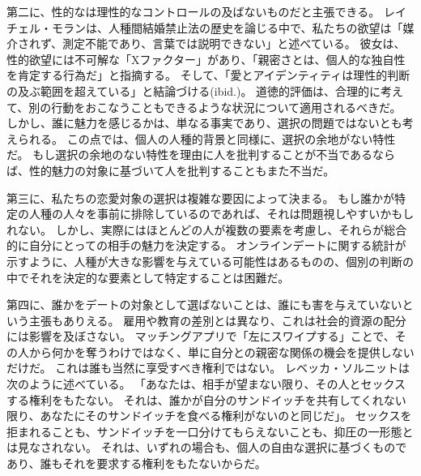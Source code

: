 \documentclass[paper=a4,book,openany]{jlreq}
\begin{document}
第二に、性的なは理性的なコントロールの及ばないものだと主張できる。
レイチェル・モランは、人種間結婚禁止法の歴史を論じる中で、私たちの欲望は「媒介されず、測定不能であり、言葉では説明できない」と述べている\citep[p. 14]{moran01:_inter_intim}。
彼女は、性的欲望には不可解な「Xファクター」があり、「親密さとは、個人的な独自性を肯定する行為だ」と指摘する。
そして、「愛とアイデンティティは理性的判断の及ぶ範囲を超えている」と結論づける(ibid.)。
道徳的評価は、合理的に考えて、別の行動をおこなうこともできるような状況について適用されるべきだ。
しかし、誰に魅力を感じるかは、単なる事実であり、選択の問題ではないとも考えられる。
この点では、個人の人種的背景と同様に、選択の余地がない特性だ。
もし選択の余地のない特性を理由に人を批判することが不当であるならば、性的魅力の対象に基づいて人を批判することもまた不当だ。

第三に、私たちの恋愛対象の選択は複雑な要因によって決まる。
もし誰かが特定の人種の人々を事前に排除しているのであれば、それは問題視しやすいかもしれない。
しかし、実際にはほとんどの人が複数の要素を考慮し、それらが総合的に自分にとっての相手の魅力を決定する。
オンラインデートに関する統計が示すように、人種が大きな影響を与えている可能性はあるものの、個別の判断の中でそれを決定的な要素として特定することは困難だ。

第四に、誰かをデートの対象として選ばないことは、誰にも害を与えていないという主張もありえる。
雇用や教育の差別とは異なり、これは社会的資源の配分には影響を及ぼさない。
マッチングアプリで「左にスワイプする」ことで、その人から何かを奪うわけではなく、単に自分との親密な関係の機会を提供しないだけだ。
これは誰も当然に享受すべき権利ではない。
レベッカ・ソルニットは次のように述べている。
「あなたは、相手が望まない限り、その人とセックスする権利をもたない。
それは、誰かが自分のサンドイッチを共有してくれない限り、あなたにそのサンドイッチを食べる権利がないのと同じだ」\citep{solnit15:_men_explain_lolit_me}。
セックスを拒まれることも、サンドイッチを一口分けてもらえないことも、抑圧の一形態とは見なされない。
それは、いずれの場合も、個人の自由な選択に基づくものであり、誰もそれを要求する権利をもたないからだ。
\end{document}

